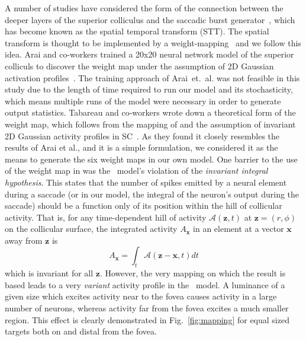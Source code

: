 \documentclass{frontiersSCNS}
\begin{document}
A number of studies have considered the form of the connection between
the deeper layers of the superior colliculus and the saccadic burst
generator~\cite{van_gisbergen_experimental_1985,ottes_visuomotor_1986,waitzman_superior_1991,groh_converting_2001,arai_model_2004,goossens_dynamic_2006,tabareau_geometry_2007,van_opstal_linear_2008,goossens_optimal_2012},
which has become known as the spatial temporal transform (STT).  The
spatial transform is thought to be implemented by a
weight-mapping~\cite{tabareau_geometry_2007,arai_model_2004} and we
follow this idea.
Arai and co-workers trained a 20x20 neural network model of the
superior colliculs to discover the weight map under the assumption of
2D Gaussian activation profiles~\cite{arai_model_2004}.
%
The training approach of Arai~et.~al. was not feasible in this study
due to the length of time required to run our model and its
stochasticity, which means multiple runs of the model were necessary
in order to generate output statistics.
%
Tabareau and co-workers wrote down a theoretical form of the weight
map, which follows from the mapping of \cite{ottes_visuomotor_1986}
and the assumption of invariant 2D Gaussian activity profiles in
SC~\cite{tabareau_geometry_2007}. As they found it closely resembles the
results of Arai et al., and it is a simple formulation, we considered
it as the means to generate the six weight maps in our own model.
%
One barrier to the use of the weight map
in \cite{tabareau_geometry_2007} was the \ccg~model's violation of the
\emph{invariant integral hypothesis}. This states that the number of spikes
emitted by a neural element during a saccade (or in our model, the
integral of the neuron's output during the saccade) should be a
function only of its position within the hill of collicular
activity. That is, for any time-dependent hill of activity
$\mathcal{A}(\mathbf{z},t)$ at $\mathbf{z} = (r,\phi)$ on the collicular
surface, the integrated activity  $A_{\mathbf{x}}$ in an element at a
vector $\mathbf{x}$ away from $\mathbf{z}$ is
\[
A_{\mathbf{x}} = \int_t \mathcal{A}(\mathbf{z}-\mathbf{x}, t) dt
\]
which is invariant for all $\mathbf{z}$. However, the very mapping on
which the \cite{tabareau_geometry_2007} result is based leads to a
very \emph{variant} activity profile in the \ccg~model. A luminance of
a given size which excites activity near to the fovea causes activity
in a large number of neurons, whereas activity far from the fovea
excites a much smaller region. This effect is clearly demonstrated in
Fig.~\ref{fig:mapping} for equal sized targets both on and distal from
the fovea.
\end{document}
